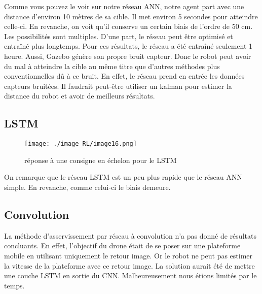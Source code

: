Comme vous pouvez le voir sur notre réseau ANN, notre agent part avec une distance d’environ 10 mètres de sa cible. 
Il met environ 5 secondes pour atteindre celle-ci. En revanche, on voit qu’il conserve un certain biais de l’ordre de 50 cm. Les possibilités sont multiples.
D’une part, le réseau peut être optimisé et entraîné plus longtemps. Pour ces résultats, le réseau a été entraîné seulement 1 heure.
Aussi, Gazebo génère son propre bruit capteur. Donc le robot peut avoir du mal à atteindre la cible au même titre que d’autres méthodes plus conventionnelles dû à ce bruit.
En effet, le réseau prend en entrée les données capteurs bruitées.
Il faudrait peut-être utiliser un kalman pour estimer la distance du robot et avoir de meilleurs résultats.

\subsection{LSTM}

\begin{figure}[H]
    \centering
    \texttt{[image: ./image\_RL/image16.png]}
    \caption{ réponse à une consigne en échelon pour le LSTM    }
\end{figure}

On remarque que le réseau LSTM est un peu plus rapide que le réseau ANN simple. En revanche, comme celui-ci le biais demeure.

\subsection{Convolution}
La méthode d’asservissement par réseau à convolution n’a pas donné de résultats concluants. En effet, l’objectif du drone était de se poser sur une plateforme mobile en utilisant uniquement le retour image.
Or le robot ne peut pas estimer la vitesse de la plateforme avec ce retour image.
La solution aurait été de mettre une couche LSTM en sortie du CNN.
Malheureusement nous étions limités par le temps.
\cite{DBLP}
